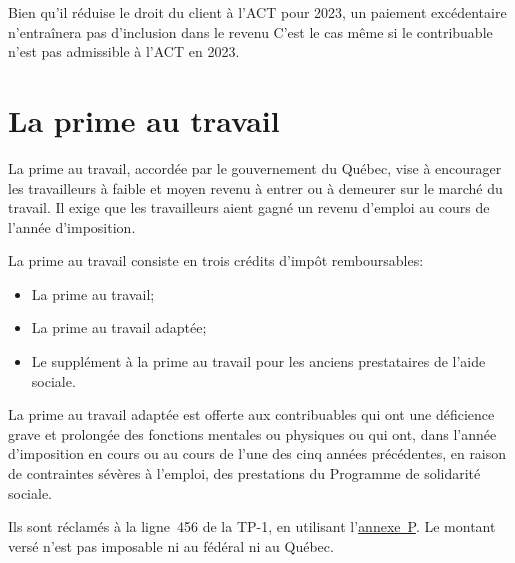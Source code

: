 Bien qu'il réduise le droit du client à l'ACT pour 2023, un paiement excédentaire n'entraînera pas d'inclusion dans le revenu C'est le cas même si le contribuable n'est pas admissible à l'ACT en 2023.



\section{La prime au travail}
\begin{intro}
	La prime au travail, accordée par le gouvernement du Québec, vise à encourager les travailleurs à faible et moyen revenu à entrer ou à demeurer sur le marché du travail. Il exige que les travailleurs aient gagné un revenu d'emploi au cours de l'année d'imposition.
\end{intro}
La prime au travail consiste en trois crédits d'impôt remboursables:
\begin{itemize}
	\item La prime au travail;
	\item La prime au travail adaptée;
	\item Le supplément à la prime au travail pour les anciens prestataires de l'aide sociale.
\end{itemize}
\begin{note}
	La prime au travail adaptée est offerte aux contribuables qui ont une déficience grave et prolongée des fonctions mentales ou physiques ou qui ont, dans l'année d'imposition en cours ou au cours de l'une des cinq années précédentes, en raison de contraintes sévères à l'emploi, des prestations du Programme de solidarité sociale.
\end{note}
Ils sont réclamés à la ligne~456 de la TP-1, en utilisant l'\href{https://www.revenuquebec.ca/documents/fr/formulaires/tp/2023-12/TP-1.D.P%282023-12%29.pdf}{annexe~P}. Le montant versé n'est pas imposable ni au fédéral ni au Québec. 


